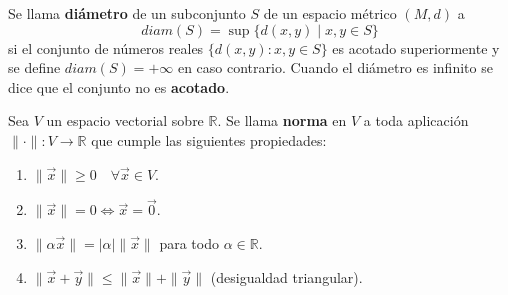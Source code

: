 \begin{definición}[Diámetro]
    Se llama \textbf{diámetro} de un subconjunto $S$ de un espacio métrico $(M, d)$ a
    $$diam(S) = \sup\{d(x, y) \mid x, y \in S\}$$
    si el conjunto de números reales $\{d(x,y) : x,y \in S\}$ es acotado superiormente y se define $diam(S) = +\infty$ en caso contrario. Cuando el diámetro es infinito se dice que el conjunto no es \textbf{acotado}.
\end{definición}

\begin{definición}[Norma]
    Sea $V$ un espacio vectorial sobre $\mathbb{R}$. Se llama \textbf{norma} en $V$ a toda aplicación $\|\cdot\|: V \to \mathbb{R}$ que cumple las siguientes propiedades:
    \begin{enumerate}
        \item $\|\vec{x}\| \geq 0 \quad \forall \vec{x} \in V$.
        \item $\|\vec{x}\| = 0 \Leftrightarrow \vec{x} = \vec{0}$.
        \item $\|\alpha \vec{x}\| = |\alpha| \|\vec{x}\|$ para todo $\alpha \in \mathbb{R}$.
        \item $\|\vec{x} + \vec{y}\| \leq \|\vec{x}\| + \|\vec{y}\|$ (desigualdad triangular).
    \end{enumerate}
\end{definición}


